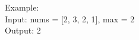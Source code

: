 \documentclass[preview]{standalone}
\begin{document}
Example:\\Input: nums = [2, 3, 2, 1], max = 2\\Output: 2\\
\end{document}

